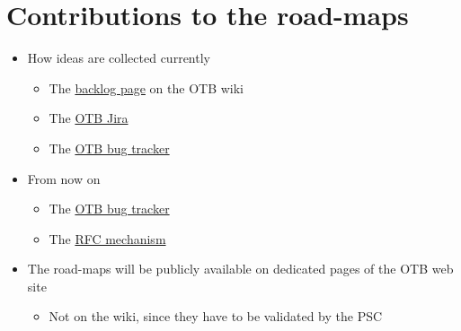 \documentclass[8pt]{beamer}
\begin{document}
\section{Contributions to the road-maps}
\label{sec-9}
\begin{itemize}
\item How ideas are collected currently
\begin{itemize}
\item The \href{http://wiki.orfeo-toolbox.org/index.php/OTB_Backlog}{backlog page} on the OTB wiki
\item The \href{http://scrum.orfeo-toolbox.org/}{OTB Jira}
\item The \href{https://bugs.orfeo-toolbox.org/my_view_page.php}{OTB bug tracker}
\end{itemize}
\item From now on
\begin{itemize}
\item The \href{https://bugs.orfeo-toolbox.org/my_view_page.php}{OTB bug tracker}
\item The \href{http://wiki.orfeo-toolbox.org/index.php/Project_Steering_Committee#Requests_for_changes}{RFC mechanism}
\end{itemize}
\item The road-maps will be publicly available on dedicated pages of the
OTB web site
\begin{itemize}
\item Not on the wiki, since they have to be validated by the PSC
\end{itemize}
\end{itemize}
\end{document}
